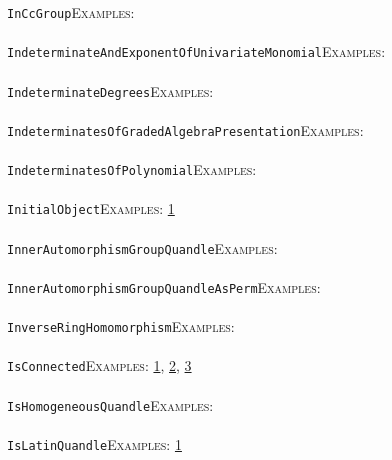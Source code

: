 \documentclass[a4paper,11pt]{report}
\begin{document}
{{ \texttt{InCcGroup}{\nobreakspace}{\nobreakspace}{\nobreakspace}{\nobreakspace}\textsc{Examples:} \\
 \\
 \texttt{IndeterminateAndExponentOfUnivariateMonomial}{\nobreakspace}{\nobreakspace}{\nobreakspace}{\nobreakspace}\textsc{Examples:} \\
 \\
 \texttt{IndeterminateDegrees}{\nobreakspace}{\nobreakspace}{\nobreakspace}{\nobreakspace}\textsc{Examples:} \\
 \\
 \texttt{IndeterminatesOfGradedAlgebraPresentation}{\nobreakspace}{\nobreakspace}{\nobreakspace}{\nobreakspace}\textsc{Examples:} \\
 \\
 \texttt{IndeterminatesOfPolynomial}{\nobreakspace}{\nobreakspace}{\nobreakspace}{\nobreakspace}\textsc{Examples:} \\
 \\
 \texttt{InitialObject}{\nobreakspace}{\nobreakspace}{\nobreakspace}{\nobreakspace}\textsc{Examples:} \href{../www/SideLinks/About/aboutAbelianCategories.html} {1}{\nobreakspace} \\
 \\
 \texttt{InnerAutomorphismGroupQuandle}{\nobreakspace}{\nobreakspace}{\nobreakspace}{\nobreakspace}\textsc{Examples:} \\
 \\
 \texttt{InnerAutomorphismGroupQuandleAsPerm}{\nobreakspace}{\nobreakspace}{\nobreakspace}{\nobreakspace}\textsc{Examples:} \\
 \\
 \texttt{InverseRingHomomorphism}{\nobreakspace}{\nobreakspace}{\nobreakspace}{\nobreakspace}\textsc{Examples:} \\
 \\
 \texttt{IsConnected}{\nobreakspace}{\nobreakspace}{\nobreakspace}{\nobreakspace}\textsc{Examples:} \href{../www/SideLinks/About/aboutQuandles2.html} {1}{\nobreakspace}, \href{../www/SideLinks/About/aboutQuandles.html} {2}{\nobreakspace}, \href{../www/SideLinks/About/aboutKnotsQuandles.html} {3}{\nobreakspace} \\
 \\
 \texttt{IsHomogeneousQuandle}{\nobreakspace}{\nobreakspace}{\nobreakspace}{\nobreakspace}\textsc{Examples:} \\
 \\
 \texttt{IsLatinQuandle}{\nobreakspace}{\nobreakspace}{\nobreakspace}{\nobreakspace}\textsc{Examples:} \href{../www/SideLinks/About/aboutQuandles.html} {1}{\nobreakspace} \\
}}
\end{document}

